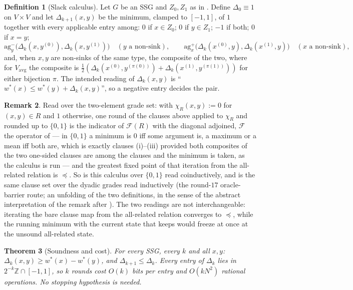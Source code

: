 \documentclass[11pt]{article}
\theoremstyle{plain}
\newtheorem{theorem}{Theorem}[section]
\theoremstyle{definition}
\newtheorem{definition}[theorem]{Definition}
\newtheorem{remark}[theorem]{Remark}
\newcommand{\Vavg}{V_{\mathrm{avg}}}
\begin{document}
\begin{definition}[Slack calculus]\label{def:slack}
Let $G$ be an SSG and $Z_0,Z_1$ as in . Define
$\Delta_0\equiv1$ on $V\times V$ and let $\Delta_{k+1}(x,y)$ be the
minimum, clamped to $[-1,1]$, of $1$ together with every applicable
entry among: $0$ if $x\in Z_0$; $0$ if $y\in Z_1$; $-1$ if both; $0$ if
$x=y$;
\[
  \mathrm{ag}^{-}_{y}\bigl(\Delta_k(x,y^{(0)}),\Delta_k(x,y^{(1)})\bigr)
  \quad(y\text{ a non-sink}),\qquad
  \mathrm{ag}^{+}_{x}\bigl(\Delta_k(x^{(0)},y),\Delta_k(x^{(1)},y)\bigr)
  \quad(x\text{ a non-sink}),
\]
and, when $x,y$ are non-sinks of the same type, the composite of the two,
where for $\Vavg$ the composite is
$\tfrac12(\Delta_k(x^{(0)},y^{(\pi(0))})+\Delta_k(x^{(1)},y^{(\pi(1))}))$
for either bijection $\pi$. The intended reading of $\Delta_k(x,y)$ is
``$w^\ast(x)\le w^\ast(y)+\Delta_k(x,y)$'', so a negative entry decides
the pair.
\end{definition}

\begin{remark}\label{rem:slack-grade}
Read over the two-element grade set: with $\chi_R(x,y):=0$ for $(x,y)\in R$
and $1$ otherwise, one round of the clauses above applied to $\chi_R$ and
rounded up to $\{0,1\}$ is the indicator of $\mathcal F(R)$ with the
diagonal adjoined, $\mathcal F$ the operator of  --- in
$\{0,1\}$ a minimum is $0$ iff some argument is, a maximum or a mean iff
both are, which is exactly clauses (i)--(iii) provided both composites
of the two one-sided clauses are among the clauses and the minimum is
taken, as the calculus is run --- and the greatest fixed
point of that iteration from the all-related relation is $\preceq$. So
 is this calculus over $\{0,1\}$ read coinductively,
and  is the same clause set over the dyadic grades read
inductively (the round-$17$ oracle-barrier route; an unfolding of the two
definitions, in the sense of the abstract interpretation of the remark
after ). The two readings are not
interchangeable: iterating the bare clause map from the all-related
relation converges to $\preceq$, while the running minimum with the
current state that  keeps would freeze at once at the
unsound all-related state.
\end{remark}

\begin{theorem}[Soundness and cost]\label{thm:slack-sound}
For every SSG, every $k$ and all $x,y$: $\Delta_k(x,y)\ge
w^\ast(x)-w^\ast(y)$, and $\Delta_{k+1}\le\Delta_k$. Every entry of
$\Delta_k$ lies in $2^{-k}\mathbb{Z}\cap[-1,1]$, so $k$ rounds cost
$O(k)$ bits per entry and $O(kN^{2})$ rational operations. No stopping
hypothesis is needed.
\end{theorem}
\end{document}
